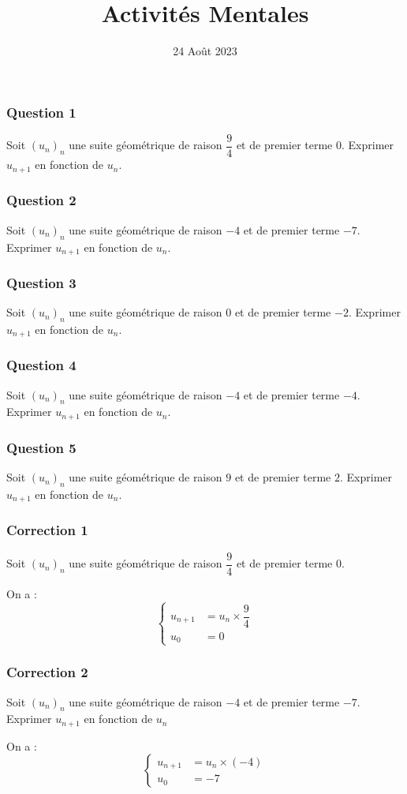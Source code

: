 \documentclass[15pt, mathserif]{beamer}
\title{Activités Mentales}
\date{24 Août 2023}
\begin{document}
\begin{frame}
    \titlepage
\end{frame}

\begin{frame} 
	\frametitle{Question 1}
Soit $(u_n)_n$ une suite géométrique de raison $\dfrac{9}{4}$ et de premier terme $0$. Exprimer $u_{n+1}$ en fonction de $u_n$. \end{frame}


\begin{frame} 
	\frametitle{Question 2}
Soit $(u_n)_n$ une suite géométrique de raison $-4$ et de premier terme $-7$. Exprimer $u_{n+1}$ en fonction de $u_n$. \end{frame}


\begin{frame} 
	\frametitle{Question 3}
Soit $(u_n)_n$ une suite géométrique de raison $0$ et de premier terme $-2$. Exprimer $u_{n+1}$ en fonction de $u_n$. \end{frame}


\begin{frame} 
	\frametitle{Question 4}
Soit $(u_n)_n$ une suite géométrique de raison $-4$ et de premier terme $-4$. Exprimer $u_{n+1}$ en fonction de $u_n$. \end{frame}


\begin{frame} 
	\frametitle{Question 5}
Soit $(u_n)_n$ une suite géométrique de raison $9$ et de premier terme $2$. Exprimer $u_{n+1}$ en fonction de $u_n$. \end{frame}


\begin{frame}
\vspace{-10mm}
	\frametitle{Correction 1}
Soit $(u_n)_n$ une suite géométrique de raison $\dfrac{9}{4}$ et de premier terme $0$. 
 
 On a : $$ \left\{ 
 \begin{array}{ll} 
 u_{n+1} &= u_n \times\dfrac{9}{4} \\ 
 u_0 & = 0 
 \end{array} 
 \right. $$ 
 \end{frame}


\begin{frame}
\vspace{-10mm}
	\frametitle{Correction 2}
Soit $(u_n)_n$ une suite géométrique de raison $-4$ et de premier terme $-7$. Exprimer $u_{n+1}$ en fonction de $u_n$ 
 
 On a : $$ \left\{ 
 \begin{array}{ll} 
 u_{n+1} &= u_n \times \left(-4\right) \\ 
 u_0 & = -7 
 \end{array} 
 \right. $$ 
 \end{frame}
\end{document}
